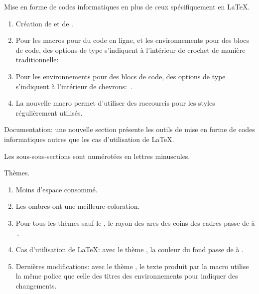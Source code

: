 \begin{tdocnew}
	\item Mise en forme de codes informatiques en plus de ceux spécifiquement en \LaTeX.
	\begin{enumerate}
		\item Création de  et de .

		\item Pour les macros pour du code en ligne, et les environnements pour des blocs de code, des options de type  s'indiquent à l'intérieur de crochet de manière traditionnelle: \,.

		\item Pour les environnements pour des blocs de code, des options de type  s'indiquent à l'intérieur de chevrons: \,.

		\item La nouvelle macro  permet d'utiliser des raccourcis pour les styles  régulièrement utilisés.
	\end{enumerate}

	\item Documentation: une nouvelle section présente les outils de mise en forme de codes informatiques autres que les cas d'utilisation de \LaTeX.
\end{tdocnew}


\begin{tdocupdate}
	\item Les sous-sous-sections sont numérotées en lettres minuscules.

	\item Thèmes.
	\begin{enumerate}
		\item Moins d'espace consommé.

		\item Les ombres ont une meilleure coloration.

		\item Pour tous les thèmes sauf le , le rayon des arcs des coins des cadres passe de \tdoclatexin{.75mm} à \tdoclatexin{.2pt}\,.

 		\item Cas d'utilisation de \LaTeX: avec le thème , la couleur du fond passe de  à .

		\item Dernières modifications: avec le thème , le texte \tdoclatexin{[Init]} produit par la macro  utilise la même police que celle des titres des environnements pour indiquer des changements.
	\end{enumerate}
\end{tdocupdate}

